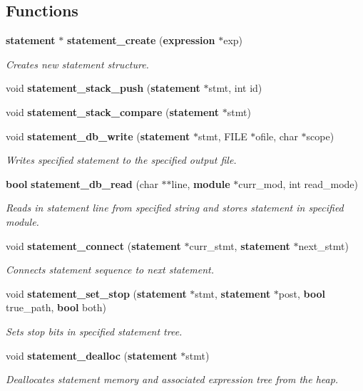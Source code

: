 \subsection*{Functions}
\begin{CompactItemize}
\item 
{\bf statement} $\ast$ {\bf statement\_\-create} ({\bf expression} $\ast$exp)
\begin{CompactList}\small\item\em Creates new statement structure.\item\end{CompactList}\item 
void {\bf statement\_\-stack\_\-push} ({\bf statement} $\ast$stmt, int id)
\item 
void {\bf statement\_\-stack\_\-compare} ({\bf statement} $\ast$stmt)
\item 
void {\bf statement\_\-db\_\-write} ({\bf statement} $\ast$stmt, FILE $\ast$ofile, char $\ast$scope)
\begin{CompactList}\small\item\em Writes specified statement to the specified output file.\item\end{CompactList}\item 
{\bf bool} {\bf statement\_\-db\_\-read} (char $\ast$$\ast$line, {\bf module} $\ast$curr\_\-mod, int read\_\-mode)
\begin{CompactList}\small\item\em Reads in statement line from specified string and stores statement in specified module.\item\end{CompactList}\item 
void {\bf statement\_\-connect} ({\bf statement} $\ast$curr\_\-stmt, {\bf statement} $\ast$next\_\-stmt)
\begin{CompactList}\small\item\em Connects statement sequence to next statement.\item\end{CompactList}\item 
void {\bf statement\_\-set\_\-stop} ({\bf statement} $\ast$stmt, {\bf statement} $\ast$post, {\bf bool} true\_\-path, {\bf bool} both)
\begin{CompactList}\small\item\em Sets stop bits in specified statement tree.\item\end{CompactList}\item 
void {\bf statement\_\-dealloc} ({\bf statement} $\ast$stmt)
\begin{CompactList}\small\item\em Deallocates statement memory and associated expression tree from the heap.\item\end{CompactList}\end{CompactItemize}
